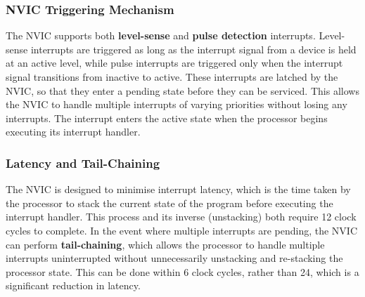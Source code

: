 \documentclass{article}
\begin{document}
\subsubsection{NVIC Triggering Mechanism}
The NVIC supports both \textbf{level-sense} and \textbf{pulse
detection} interrupts. Level-sense interrupts are triggered as long as
the interrupt signal from a device is held at an active level, while
pulse interrupts are triggered only when the interrupt signal
transitions from inactive to active. These interrupts are latched by
the NVIC, so that they enter a pending state before they can be
serviced. This allows the NVIC to handle multiple interrupts of varying
priorities without losing any interrupts. The interrupt enters the
active state when the processor begins executing its interrupt handler.
\subsubsection{Latency and Tail-Chaining}
The NVIC is designed to minimise interrupt latency, which is the time
taken by the processor to stack the current state of the program before
executing the interrupt handler. This process and its inverse
(unstacking) both require 12 clock cycles to complete. In the event
where multiple interrupts are pending, the NVIC can perform
\textbf{tail-chaining}, which allows the processor to handle multiple
interrupts uninterrupted without unnecessarily unstacking and
re-stacking the processor state. This can be done within 6 clock
cycles, rather than 24, which is a significant reduction in latency.
\end{document}
